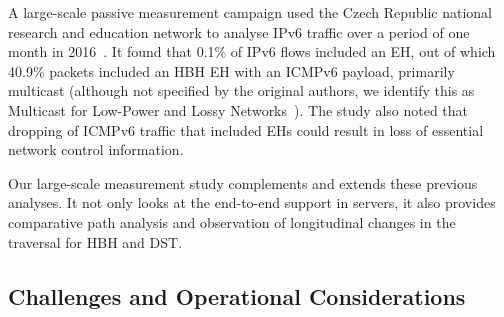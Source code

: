 \documentclass[conference]{IEEEtran}
\begin{document}

A large-scale passive measurement campaign used the Czech Republic national
research and education network to analyse IPv6 traffic over a period of one month in
2016~\cite{passive-threats}. It found that 0.1\% of IPv6 flows included an EH, out of which 40.9\% packets included an HBH EH with an ICMPv6
payload, primarily multicast (although not specified by the original authors,
we identify this as Multicast for Low-Power and Lossy Networks~\cite{RFC7731}).
The study also noted that dropping of ICMPv6 traffic that included EHs could result in
loss of essential network control information. 


Our large-scale measurement study complements and extends these previous analyses. It not only
looks at the end-to-end support in servers, it also provides comparative path
analysis and observation of longitudinal changes in the traversal for HBH and DST.

\subsection{Challenges and Operational Considerations}
\end{document}
